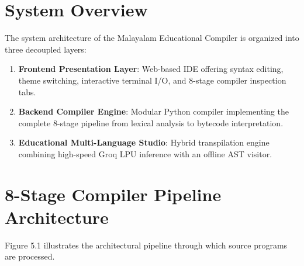 \documentclass[12pt,a4paper]{report}
\begin{document}
\section{System Overview}
The system architecture of the Malayalam Educational Compiler is organized into three decoupled layers:
\begin{enumerate}
    \item \textbf{Frontend Presentation Layer}: Web-based IDE offering syntax editing, theme switching, interactive terminal I/O, and 8-stage compiler inspection tabs.
    \item \textbf{Backend Compiler Engine}: Modular Python compiler implementing the complete 8-stage pipeline from lexical analysis to bytecode interpretation.
    \item \textbf{Educational Multi-Language Studio}: Hybrid transpilation engine combining high-speed Groq LPU inference with an offline AST visitor.
\end{enumerate}

\section{8-Stage Compiler Pipeline Architecture}
Figure 5.1 illustrates the architectural pipeline through which source programs are processed.
\end{document}
